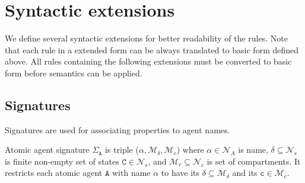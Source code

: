 \documentclass{entcs}
\renewcommand{\~}[0]{\texttildelow}
\begin{document}







\section{Syntactic extensions}

We define several syntactic extensions for better readability of the rules. Note that each rule in a extended form can be always translated to basic form defined above. All rules containing the following extensions must be converted to basic form before semantics can be applied.

\subsection{Signatures}

Signatures are used for associating properties to agent names.

\begin{defn}
Atomic agent signature $\Sigma_\mathtt{A}$ is triple ($\alpha, \mathcal{M}_\delta, \mathcal{M}_c$) where $\alpha \in \mathcal{N}_{A}$ is name, $\delta \subseteq \mathcal{N}_{s}$ is finite non-empty set of states $\mathtt{C} \in \mathcal{N}_{s}$, and $\mathcal{M}_c \subseteq \mathcal{N}_{c}$ is set of compartments. It restricts each atomic agent $\mathtt{A}$ with name $\alpha$ to have its $\delta \subseteq \mathcal{M}_\delta$ and its $\mathtt{c} \in \mathcal{M}_c$. 
\end{defn}
\end{document}
